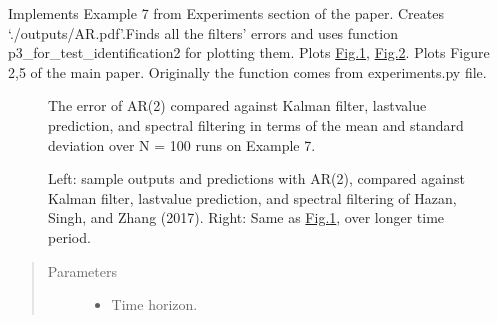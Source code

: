 \documentclass[letterpaper,10pt,english]{sphinxmanual}
\begin{document}
\begin{fulllineitems}
\label{\detokenize{LDS:LDS.OnlineLDS_library.test_identification2}}
\sphinxAtStartPar
Implements Example 7 from Experiments section of the paper.
Creates ‘./outputs/AR.pdf’.Finds all the filters’ errors and
uses function p3\_for\_test\_identification2 for plotting them.
Plots \hyperref[\detokenize{LDS:fig2}]{Fig.\@ \ref{\detokenize{LDS:fig2}}}, \hyperref[\detokenize{LDS:fig5}]{Fig.\@ \ref{\detokenize{LDS:fig5}}}. Plots Figure 2,5 of the main paper.
Originally the function comes from experiments.py file.

\begin{figure}[htbp]
\centering
\capstart

\noindent{}
\caption{The error of AR(2) compared against Kalman filter, last\sphinxhyphen{}value prediction,
and spectral filtering in terms of the mean and standard deviation over
N = 100 runs on Example 7.}\label{\detokenize{LDS:id6}}\label{\detokenize{LDS:fig2}}\end{figure}

\begin{figure}[htbp]
\centering
\capstart

\noindent{}
\caption{Left: sample outputs and predictions with AR(2), compared against Kalman filter,
last\sphinxhyphen{}value prediction, and spectral filtering of Hazan, Singh, and Zhang (2017).
Right: Same as \hyperref[\detokenize{LDS:fig2}]{Fig.\@ \ref{\detokenize{LDS:fig2}}}, over longer time period.}\label{\detokenize{LDS:id7}}\label{\detokenize{LDS:fig5}}\end{figure}
\begin{quote}\begin{description}
\item[{Parameters}] \leavevmode\begin{itemize}
\item {} 
\sphinxAtStartPar
{} \textendash{} Time horizon.


\end{itemize}
\end{description}
\end{quote}
\end{fulllineitems}
\end{document}
